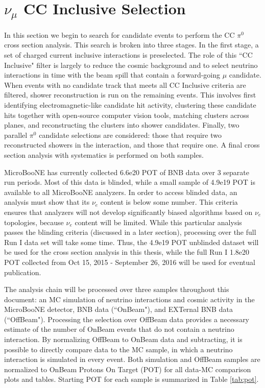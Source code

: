 \clearpage
\section{ $\nu_{\mu}$ CC Inclusive Selection}


\par In this section we begin to search for candidate events to perform the CC $\pi^0$ cross section analysis. This search is broken into three stages.  In the first stage, a set of charged current inclusive interactions is preselected. The role of this ``CC Inclusive" filter is largely to reduce the cosmic background and to select neutrino interactions in time with the beam spill that contain a forward-going $\mu$ candidate.  When events with no candidate track that meets all CC Inclusive criteria are filtered, shower reconstruction is run on the remaining events.  This involves first identifying electromagnetic-like candidate hit activity, clustering these candidate hits together with open-source computer vision tools, matching clusters across planes, and reconstructing the clusters into shower candidates.  Finally, two parallel $\pi^0$ candidate selections are considered: those that require two reconstructed showers in the interaction, and those that require one.  A final cross section analysis with systematics is performed on both samples.
\par MicroBooNE has currently collected 6.6e20 POT of BNB data over 3 separate run periods. Most of this data is blinded, while a small sample of 4.9e19 POT is available to all MicroBooNE analyzers.  In order to access blinded data, an analysis must show that its $\nu_e$ content is below some number.  This criteria ensures that analyzers will not develop significantly biased algorithms based on $\nu_e$ topologies, because $\nu_e$ content will be limited. While this particular analysis passes the blinding criteria (discussed in a later section), processing over the full Run I data set will take some time.  Thus, the 4.9e19 POT unblinded dataset will be used for the cross section analysis in this thesis, while the full Run I 1.8e20 POT collected from Oct 15, 2015 - September 26, 2016 will be used for eventual publication.
\par The analysis chain will be processed over three samples throughout this document: an MC simulation of neutrino interactions and cosmic activity in the MicroBooNE detector, BNB data (``OnBeam"), and EXTernal BNB data (``OffBeam").  Processing the selection over OffBeam data provides a necessary estimate of the number of OnBeam events that do not contain a neutrino interaction.  By normalizing OffBeam to OnBeam data and subtracting, it is possible to directly compare data to the MC sample, in which a neutrino interaction is simulated in every event.  Both simulation and OffBeam samples are normalized to OnBeam Protons On Target (POT) for all data-MC comparison plots and tables.  Starting POT for each sample is summarized in Table \ref{tab:pot}.




